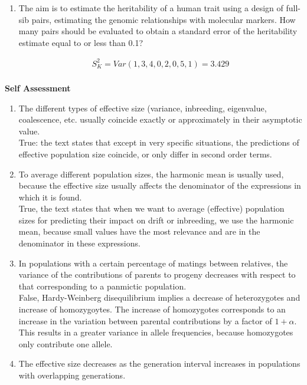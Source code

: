 \documentclass[12pt]{amsart}
\begin{document}
\begin{enumerate}
\item The aim is to estimate the heritability of a human trait using a design of full-sib pairs, estimating the genomic relationships with molecular markers. How many pairs should be evaluated to obtain a standard error of the heritability estimate equal to or less than 0.1?

\begin{gather*}
S_K^2 = Var(1,3,4,0,2,0,5,1) = 3.429\\
\end{gather*}

\end{enumerate}

{\large \bf Self Assessment}
\begin{enumerate}
\item The different types of effective size (variance, inbreeding, eigenvalue, coalescence, etc. usually coincide exactly or approximately in their asymptotic value.\\
True: the text states that except in very specific situations, the predictions of effective population size coincide, or only differ in second order terms.\\
\item To average different population sizes, the harmonic mean is usually used, because the effective size usually affects the denominator of the expressions in which it is found.\\
True, the text states that when we want to average (effective) population sizes for predicting their impact on drift or inbreeding, we use the harmonic mean, because small values have the most relevance and are in the denominator in these expressions. \\
\item In populations with a certain percentage of matings between relatives, the variance of the contributions of parents to progeny decreases with respect to that corresponding to a panmictic population.\\
False, Hardy-Weinberg disequilibrium implies a decrease of heterozygotes and increase of homozygoytes. The increase of homozygotes corresponds to an increase in the variation between parental contributions by a factor of $1 + \alpha$. This results in a greater variance in allele frequencies, because homozygotes only contribute one allele. \\
\item The effective size decreases as the generation interval increases in populations with overlapping generations.\\

\end{enumerate}
\end{document}
